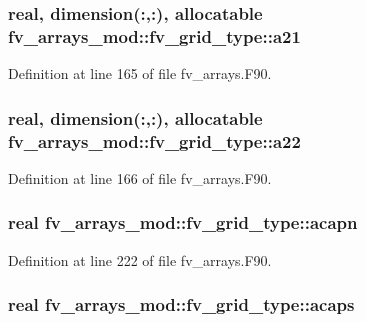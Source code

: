 \subsubsection[{a21}]{\setlength{\rightskip}{0pt plus 5cm}real, dimension(\-:,\-:), allocatable fv\-\_\-arrays\-\_\-mod\-::fv\-\_\-grid\-\_\-type\-::a21}\label{structfv__arrays__mod_1_1fv__grid__type_a231230cb675e894522f263d9bc28e64b}


Definition at line 165 of file fv\-\_\-arrays.\-F90.

\subsubsection[{a22}]{\setlength{\rightskip}{0pt plus 5cm}real, dimension(\-:,\-:), allocatable fv\-\_\-arrays\-\_\-mod\-::fv\-\_\-grid\-\_\-type\-::a22}\label{structfv__arrays__mod_1_1fv__grid__type_a71399bdc443a16413a309a4e50346579}


Definition at line 166 of file fv\-\_\-arrays.\-F90.

\subsubsection[{acapn}]{\setlength{\rightskip}{0pt plus 5cm}real fv\-\_\-arrays\-\_\-mod\-::fv\-\_\-grid\-\_\-type\-::acapn}\label{structfv__arrays__mod_1_1fv__grid__type_afe9680f64549405027e05ecfe1182922}


Definition at line 222 of file fv\-\_\-arrays.\-F90.

\subsubsection[{acaps}]{\setlength{\rightskip}{0pt plus 5cm}real fv\-\_\-arrays\-\_\-mod\-::fv\-\_\-grid\-\_\-type\-::acaps}\label{structfv__arrays__mod_1_1fv__grid__type_adb3b9b755800023ce578f3dc74602f44}


